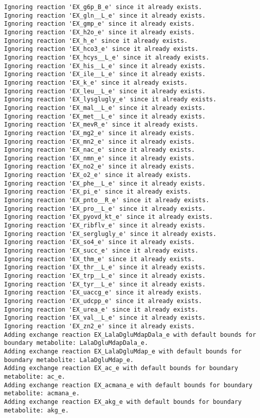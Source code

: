 \documentclass[
  letterpaper,
  DIV=11,
  numbers=noendperiod]{scrartcl}
\begin{document}
\begin{verbatim}
Ignoring reaction 'EX_g6p_B_e' since it already exists.
Ignoring reaction 'EX_gln__L_e' since it already exists.
Ignoring reaction 'EX_gmp_e' since it already exists.
Ignoring reaction 'EX_h2o_e' since it already exists.
Ignoring reaction 'EX_h_e' since it already exists.
Ignoring reaction 'EX_hco3_e' since it already exists.
Ignoring reaction 'EX_hcys__L_e' since it already exists.
Ignoring reaction 'EX_his__L_e' since it already exists.
Ignoring reaction 'EX_ile__L_e' since it already exists.
Ignoring reaction 'EX_k_e' since it already exists.
Ignoring reaction 'EX_leu__L_e' since it already exists.
Ignoring reaction 'EX_lysglugly_e' since it already exists.
Ignoring reaction 'EX_mal__L_e' since it already exists.
Ignoring reaction 'EX_met__L_e' since it already exists.
Ignoring reaction 'EX_mevR_e' since it already exists.
Ignoring reaction 'EX_mg2_e' since it already exists.
Ignoring reaction 'EX_mn2_e' since it already exists.
Ignoring reaction 'EX_nac_e' since it already exists.
Ignoring reaction 'EX_nmn_e' since it already exists.
Ignoring reaction 'EX_no2_e' since it already exists.
Ignoring reaction 'EX_o2_e' since it already exists.
Ignoring reaction 'EX_phe__L_e' since it already exists.
Ignoring reaction 'EX_pi_e' since it already exists.
Ignoring reaction 'EX_pnto__R_e' since it already exists.
Ignoring reaction 'EX_pro__L_e' since it already exists.
Ignoring reaction 'EX_pyovd_kt_e' since it already exists.
Ignoring reaction 'EX_ribflv_e' since it already exists.
Ignoring reaction 'EX_serglugly_e' since it already exists.
Ignoring reaction 'EX_so4_e' since it already exists.
Ignoring reaction 'EX_succ_e' since it already exists.
Ignoring reaction 'EX_thm_e' since it already exists.
Ignoring reaction 'EX_thr__L_e' since it already exists.
Ignoring reaction 'EX_trp__L_e' since it already exists.
Ignoring reaction 'EX_tyr__L_e' since it already exists.
Ignoring reaction 'EX_uaccg_e' since it already exists.
Ignoring reaction 'EX_udcpp_e' since it already exists.
Ignoring reaction 'EX_urea_e' since it already exists.
Ignoring reaction 'EX_val__L_e' since it already exists.
Ignoring reaction 'EX_zn2_e' since it already exists.
Adding exchange reaction EX_LalaDgluMdapDala_e with default bounds for boundary metabolite: LalaDgluMdapDala_e.
Adding exchange reaction EX_LalaDgluMdap_e with default bounds for boundary metabolite: LalaDgluMdap_e.
Adding exchange reaction EX_ac_e with default bounds for boundary metabolite: ac_e.
Adding exchange reaction EX_acmana_e with default bounds for boundary metabolite: acmana_e.
Adding exchange reaction EX_akg_e with default bounds for boundary metabolite: akg_e.

\end{verbatim}
\end{document}
